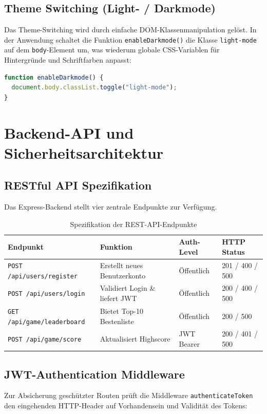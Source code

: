 \documentclass[12pt,a4paper]{article}
\begin{document}
\subsection{Theme Switching (Light- / Darkmode)}
Das Theme-Switching wird durch einfache DOM-Klassenmanipulation gelöst. In der Anwendung schaltet die Funktion \texttt{enableDarkmode()} die Klasse \texttt{light-mode} auf dem \texttt{body}-Element um, was wiederum globale CSS-Variablen für Hintergründe und Schriftfarben anpasst:

\begin{lstlisting}[language=TypeScript, caption={Theme Switch Funktionalität}]
function enableDarkmode() {
  document.body.classList.toggle("light-mode");
}
\end{lstlisting}

\section{Backend-API und Sicherheitsarchitektur}

\subsection{RESTful API Spezifikation}
Das Express-Backend stellt vier zentrale Endpunkte zur Verfügung.

\begin{table}[htbp]
  \centering
  \begin{tabularx}{\textwidth}{lXll}
    \toprule
    \textbf{Endpunkt} & \textbf{Funktion} & \textbf{Auth-Level} & \textbf{HTTP Status} \\ \midrule
    \texttt{POST /api/users/register} & Erstellt neues Benutzerkonto & Öffentlich & 201 / 400 / 500 \\
    \texttt{POST /api/users/login} & Validiert Login \& liefert JWT & Öffentlich & 200 / 400 / 500 \\
    \texttt{GET /api/game/leaderboard} & Bietet Top-10 Bestenliste & Öffentlich & 200 / 500 \\
    \texttt{POST /api/game/score} & Aktualisiert Highscore & JWT Bearer & 200 / 401 / 500 \\ \bottomrule
  \end{tabularx}
  \caption{Spezifikation der REST-API-Endpunkte}
  \label{tab:api-routes}
\end{table}

\subsection{JWT-Authentication Middleware}
Zur Absicherung geschützter Routen prüft die Middleware \texttt{authenticateToken} den eingehenden HTTP-Header auf Vorhandensein und Validität des Tokens:
\end{document}
